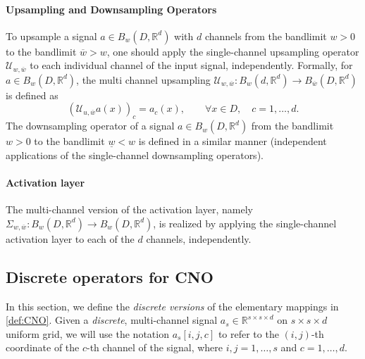 \documentclass[reqno,10pt]{amsart}
\theoremstyle{plain}
\theoremstyle{definition}
\newcommand{\bb}[1]{\mathbb{#1}}
\newcommand{\cal}[1]{\mathcal{#1}}
\begin{document}
    \paragraph{\bf Upsampling and Downsampling Operators} To upsample a signal $a \in B_w(D,\bb R^d)$ with $d$ channels from the bandlimit $w > 0$ to the bandlimit $\overline{w} > w$, one should apply the single-channel upsampling operator $\cal U_{w,\overline{w}}$ to each individual channel of the input signal, independently. Formally, for $a \in B_w(D,\bb R^d)$, the multi channel upsampling $\cal U_{w,\overline{w}} : B_w(d,\bb R^d) \to B_{\overline{w}}(D, \bb R^d)$ is defined as
    $$ (\cal U_{u,\overline{w}}a(x))_c = a_c(x), \qquad \forall x\in D,\quad c=1,\dots, d.$$
    The downsampling operator of a signal $a \in B_w(D, \bb R^d)$ from the bandlimit $w > 0$ to the bandlimit $\underline{w} < w$ is defined in a similar manner (independent applications of the single-channel downsampling operators).

    \paragraph{\bf Activation layer} The multi-channel version of the activation layer, namely $\Sigma_{w,\overline{w}} : B_w(D,\bb R^d) \to B_w(D, \bb R^d)$, is realized by applying the single-channel activation layer to each of the $d$ channels, independently.

    \subsection{\bf Discrete operators for CNO}
    In this section, we define the {\it discrete versions} of the elementary mappings in \ref{def:CNO}. Given a {\it discrete}, multi-channel signal $a_s \in \bb R^{s\times s\times d}$ on $s \times s\times d$ uniform grid, we will use the notation $a_s[i,j,c]$ to refer to the $(i,j)$-th coordinate of the $c$-th channel of the signal, where $i,j = 1, \dots, s$ and $c = 1,\dots, d$.
\end{document}
